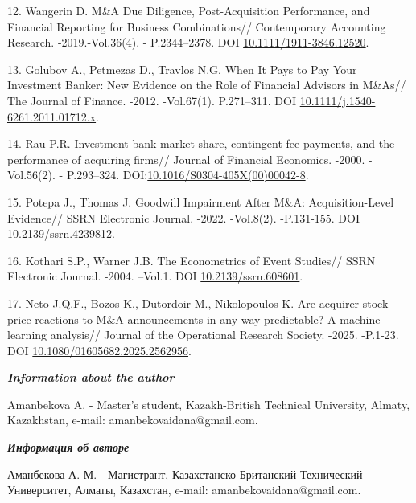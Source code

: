 \begin{refs}
12. Wangerin D. M\&A Due Diligence, Post-Acquisition Performance, and
Financial Reporting for Business Combinations// Contemporary Accounting
Research. -2019.-Vol.36(4). - P.2344--2378. DOI
\href{https://doi.org/10.1111/1911-3846.12520}{10.1111/1911-3846.12520}.

13. Golubov A., Petmezas D., Travlos N.G. When It Pays to Pay Your
Investment Banker: New Evidence on the Role of Financial Advisors in
M\&As// The Journal of Finance. -2012. -Vol.67(1). P.271--311. DOI
\href{https://doi.org/10.1111/j.1540-6261.2011.01712.x}{10.1111/j.1540-6261.2011.01712.x}.

14. Rau P.R. Investment bank market share, contingent fee payments, and
the performance of acquiring firms// Journal of Financial Economics.
-2000. -Vol.56(2). - P.293--324.
DOI:\href{https://doi.org/10.1016/S0304-405X(00)00042-8}{10.1016/S0304-405X(00)00042-8}.

15. Potepa J., Thomas J. Goodwill Impairment After M\&A:
Acquisition-Level Evidence// SSRN Electronic Journal. -2022. -Vol.8(2).
-P.131-155. DOI
\href{http://doi.org/10.2139/ssrn.4239812}{10.2139/ssrn.4239812}.

16. Kothari S.P., Warner J.B. The Econometrics of Event Studies// SSRN
Electronic Journal. -2004. --Vol.1. DOI
\href{https://doi.org/10.2139/ssrn.608601}{10.2139/ssrn.608601}.

17. Neto J.Q.F., Bozos K., Dutordoir M., Nikolopoulos K. Are acquirer
stock price reactions to M\&A announcements in any way predictable? A
machine-learning analysis// Journal of the Operational Research Society.
-2025. -P.1-23. DOI
\href{https://doi.org/10.1080/01605682.2025.2562956}{10.1080/01605682.2025.2562956}.
\end{refs}

\begin{info}
\hspace{1em}\emph{{\bfseries Information about the author}}

Amanbekova A. - Master's student, Kazakh-British Technical University,
Almaty, Kazakhstan, e-mail: amanbekovaidana@gmail.com.

\hspace{1em}\emph{{\bfseries Информация об авторе}}

Аманбекова А. М. - Магистрант, Казахстанско-Британский Технический
Университет, Алматы, Казахстан, e-mail: amanbekovaidana@gmail.com.
\end{info}

